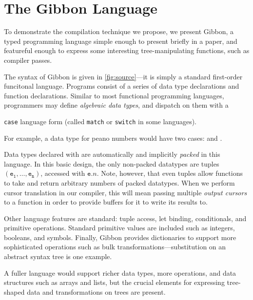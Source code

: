 \documentclass[a4paper,english]{lipics-v2016}
\newcommand{\treelang}{Gibbon\xspace} %
\newif\ifcurly
\begin{document}
\section{The \treelang{} Language}


To demonstrate the compilation technique we propose, we present
\treelang, a typed programming language simple enough to
present briefly in a paper, and featureful enough to express some
interesting tree-manipulating functions, such as compiler passes.

The syntax of \treelang is given in \cref{fig:source}---it is
simply a standard first-order funcitonal language.
Programs consist of a series of data type declarations and function
declarations. Similar to most functional programming languages,
programmers may define \emph{algebraic data types}, and dispatch on
them with a
\ifcurly
\texttt{match} language form (called \texttt{case} or \texttt{switch} in some languages).
\else
\texttt{case} language form (called \texttt{match} or \texttt{switch} in some languages).
\fi
For example, a data type for peano
numbers would have two cases:  and .


Data types declared with  are automatically and implicitly
{\em packed} in this language.  In this basic design, the only
non-packed datatypes are tuples $\mathtt{(e_1,\dots,e_n)}$, accessed with
$\mathtt{e} . n$.
%
Note, however, that even tuples allow functions to take and return arbitrary
numbers of packed datatypes.  When we perform cursor translation in our
compiler, this will mean passing multiple {\em output cursors} to a function in
order to provide buffers for it to write its results to.

Other language features are standard: tuple access, let binding,
conditionals, and primitive operations.  Standard primitive values are included
such as integers, booleans, and symbols.
%
Finally, \treelang provides dictionaries to support more sophisticated
operations such as bulk transformations---substitution on an abstract
syntax tree is one example.

A fuller language would support richer data types, more operations,
and data structures such as arrays and lists, but the crucial elements
for expressing tree-shaped data and transformations on trees are present. 
\end{document}
